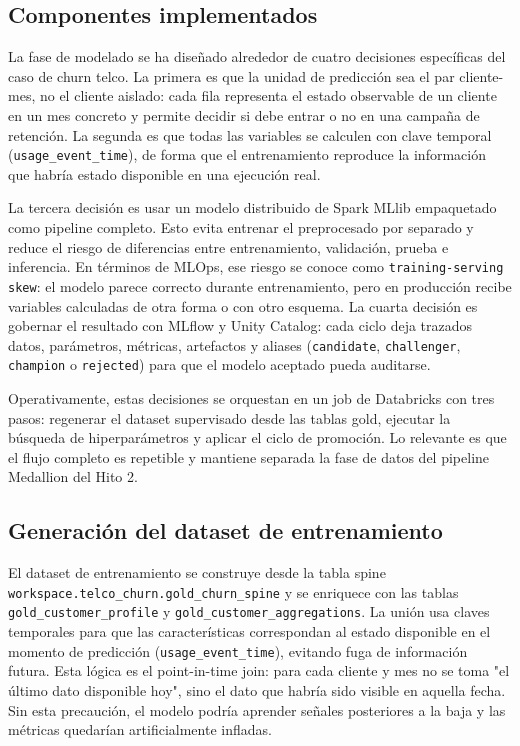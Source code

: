 \documentclass[12pt,a4paper]{article}
\begin{document}
\subsection{Componentes implementados}

La fase de modelado se ha diseñado alrededor de cuatro decisiones específicas del caso de churn telco. La primera es que la unidad de predicción sea el par cliente-mes, no el cliente aislado: cada fila representa el estado observable de un cliente en un mes concreto y permite decidir si debe entrar o no en una campaña de retención. La segunda es que todas las variables se calculen con clave temporal (\nolinkurl{usage_event_time}), de forma que el entrenamiento reproduce la información que habría estado disponible en una ejecución real.\par

La tercera decisión es usar un modelo distribuido de Spark MLlib empaquetado como pipeline completo. Esto evita entrenar el preprocesado por separado y reduce el riesgo de diferencias entre entrenamiento, validación, prueba e inferencia. En términos de MLOps, ese riesgo se conoce como \nolinkurl{training-serving skew}: el modelo parece correcto durante entrenamiento, pero en producción recibe variables calculadas de otra forma o con otro esquema. La cuarta decisión es gobernar el resultado con MLflow y Unity Catalog: cada ciclo deja trazados datos, parámetros, métricas, artefactos y aliases (\nolinkurl{candidate}, \nolinkurl{challenger}, \nolinkurl{champion} o \nolinkurl{rejected}) para que el modelo aceptado pueda auditarse.\par

Operativamente, estas decisiones se orquestan en un job de Databricks con tres pasos: regenerar el dataset supervisado desde las tablas gold, ejecutar la búsqueda de hiperparámetros y aplicar el ciclo de promoción. Lo relevante es que el flujo completo es repetible y mantiene separada la fase de datos del pipeline Medallion del Hito 2.\par

\subsection{Generación del dataset de entrenamiento}

El dataset de entrenamiento se construye desde la tabla spine \nolinkurl{workspace.telco_churn.gold_churn_spine} y se enriquece con las tablas \nolinkurl{gold_customer_profile} y \nolinkurl{gold_customer_aggregations}. La unión usa claves temporales para que las características correspondan al estado disponible en el momento de predicción (\nolinkurl{usage_event_time}), evitando fuga de información futura. Esta lógica es el point-in-time join: para cada cliente y mes no se toma "el último dato disponible hoy", sino el dato que habría sido visible en aquella fecha. Sin esta precaución, el modelo podría aprender señales posteriores a la baja y las métricas quedarían artificialmente infladas.\par
\end{document}
